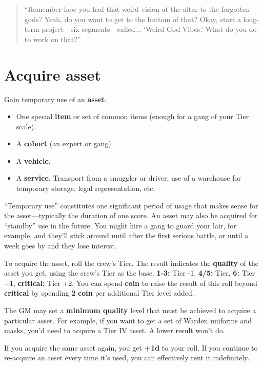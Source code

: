 \documentclass[11pt,oneside]{book}
\newcommand{\gameterm}[1]{\textbf{#1}}
\begin{document}
\begin{quote}
	“Remember how you had that weird vision at the altar to the forgotten gods? Yeah, do you want to get to the bottom of that? Okay, start a long-term project---six segments---called... ‘Weird God Vibes.’ What do you do to work on that?”
\end{quote} 

\section{Acquire asset}

Gain temporary use of an \textbf{asset}:

\begin{itemize}
	\item One special \textbf{item} or set of common items (enough for a gang of your Tier scale).
	\item A \textbf{cohort} (an expert or gang).
	\item A \textbf{vehicle}.
	\item A \textbf{service}. Transport from a smuggler or driver, use of a warehouse for temporary storage, legal representation, etc.
\end{itemize}

“Temporary use” constitutes one significant period of usage that makes sense for the asset---typically the duration of one score. An asset may also be acquired for “standby” use in the future. You might hire a gang to guard your lair, for example, and they’ll stick around until after the first serious battle, or until a week goes by and they lose interest.

To acquire the asset, roll the crew’s Tier. The result indicates the \textbf{quality} of the asset you get, using the crew’s Tier as the base. \gameterm{1-3:}  Tier -1, \gameterm{4/5:}  Tier, \gameterm{6:}  Tier +1, \gameterm{critical:}  Tier +2. You can spend \gameterm{coin}  to raise the result of this roll beyond \gameterm{critical}  by spending \textbf{2} \gameterm{coin}  per additional Tier level added.

The GM may set a \textbf{minimum quality} level that must be achieved to acquire a particular asset. For example, if you want to get a set of Warden uniforms and masks, you’d need to acquire a Tier IV asset. A lower result won’t do.

If you acquire the same asset again, you get \textbf{+1d} to your roll. If you continue to re-acquire an asset every time it’s used, you can effectively rent it indefinitely.
\end{document}
